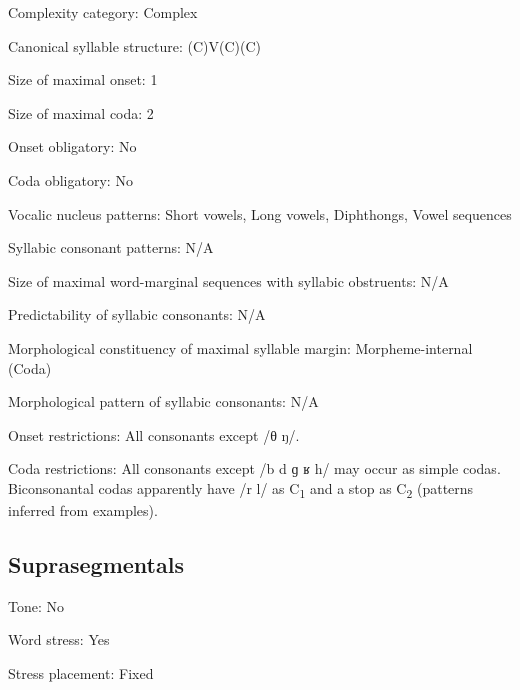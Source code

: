{\begin{appendixdesc}
\item[Complexity category:] Complex

\item[Canonical syllable structure:] (C)V(C)(C) \citep[12--18]{Poppe1964}

\item[Size of maximal onset:] 1

\item[Size of maximal coda:] 2

\item[Onset obligatory:] No

\item[Coda obligatory:] No

\item[Vocalic nucleus patterns:] Short vowels, Long vowels, Diphthongs, Vowel sequences

\item[Syllabic consonant patterns:] N/A

\item[Size of maximal word-marginal sequences with syllabic obstruents:] N/A

\item[Predictability of syllabic consonants:] N/A

\item[Morphological constituency of maximal syllable margin:] Morpheme-internal (Coda)

\item[Morphological pattern of syllabic consonants:] N/A

\item[Onset restrictions:] All consonants except /θ ŋ/.

\item[Coda restrictions:] All consonants except /b d ɡ ʁ h/ may occur as simple codas. Biconsonantal codas apparently have /r l/ as C\textsubscript{1} and a stop as C\textsubscript{2} (patterns inferred from examples).
\end{appendixdesc}
\subsection*{Suprasegmentals}
\begin{appendixdesc}
\item[Tone:] No

\item[Word stress:] Yes

\item[Stress placement:] Fixed


\end{appendixdesc}}
